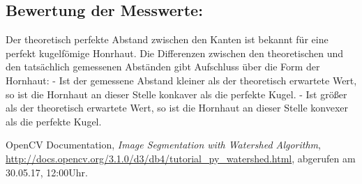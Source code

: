 \documentclass{../Vorlage/sebDenCls}
\begin{document}
\subsection{Bewertung der Messwerte:}
Der theoretisch perfekte Abstand zwischen den Kanten ist bekannt für eine perfekt kugelfömige Honrhaut. Die Differenzen zwischen den theoretischen und den tatsächlich gemessenen Abständen gibt Aufschluss über die Form der Hornhaut: 
- Ist der gemessene Abstand kleiner als der theoretisch erwartete Wert, so ist die Hornhaut an dieser Stelle konkaver als die perfekte Kugel.
- Ist größer als der theoretisch erwartete Wert, so ist die Hornhaut an dieser Stelle konvexer als die perfekte Kugel.

\begin{thebibliography}{9}
	
		OpenCV Documentation,
		\emph{Image Segmentation with Watershed Algorithm},
		\url{http://docs.opencv.org/3.1.0/d3/db4/tutorial_py_watershed.html},
		abgerufen am 30.05.17, 12:00Uhr.
	
\end{thebibliography}
\end{document}
